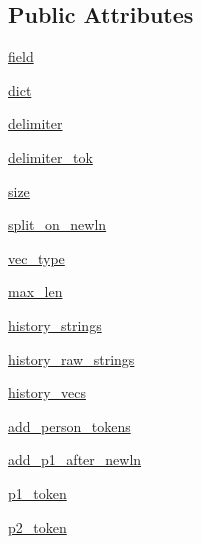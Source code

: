 \subsection*{Public Attributes}
\begin{DoxyCompactItemize}
\item 
\hyperlink{classparlai_1_1core_1_1torch__agent_1_1History_a3481b17d1cd076c5e3ee82178ea7411a}{field}
\item 
\hyperlink{classparlai_1_1core_1_1torch__agent_1_1History_af2dcae73b57a3718cdcb558377a3526b}{dict}
\item 
\hyperlink{classparlai_1_1core_1_1torch__agent_1_1History_ae9e14eb1f34edb914930178e0ecfdb01}{delimiter}
\item 
\hyperlink{classparlai_1_1core_1_1torch__agent_1_1History_a3120b2e6c188316aeffdf1bafbd5baa6}{delimiter\+\_\+tok}
\item 
\hyperlink{classparlai_1_1core_1_1torch__agent_1_1History_a18b6c863146d30b93d15de840566044b}{size}
\item 
\hyperlink{classparlai_1_1core_1_1torch__agent_1_1History_a26d15b60abb195247309c4680657a196}{split\+\_\+on\+\_\+newln}
\item 
\hyperlink{classparlai_1_1core_1_1torch__agent_1_1History_a7e5b6e0372fa48e0e1ba747b5628bfc7}{vec\+\_\+type}
\item 
\hyperlink{classparlai_1_1core_1_1torch__agent_1_1History_acded8e2717f7b9d527076c89a7fbd3f9}{max\+\_\+len}
\item 
\hyperlink{classparlai_1_1core_1_1torch__agent_1_1History_ac2aea76f6a052461e74aa050bb69408a}{history\+\_\+strings}
\item 
\hyperlink{classparlai_1_1core_1_1torch__agent_1_1History_a93643f51a5a2ab0478dff99d571c5f41}{history\+\_\+raw\+\_\+strings}
\item 
\hyperlink{classparlai_1_1core_1_1torch__agent_1_1History_a7d5060a88829f087033ea7ba928ceb1d}{history\+\_\+vecs}
\item 
\hyperlink{classparlai_1_1core_1_1torch__agent_1_1History_a1ceeb7bf9ff2209a9aafff142e667006}{add\+\_\+person\+\_\+tokens}
\item 
\hyperlink{classparlai_1_1core_1_1torch__agent_1_1History_aa0ab2c82ef1ba339dd04eafd57c082e5}{add\+\_\+p1\+\_\+after\+\_\+newln}
\item 
\hyperlink{classparlai_1_1core_1_1torch__agent_1_1History_a7eff0681e0eee4051abb530797f15884}{p1\+\_\+token}
\item 
\hyperlink{classparlai_1_1core_1_1torch__agent_1_1History_ab9f9f10b0dd73d90d3798fb3e1787ee6}{p2\+\_\+token}
\end{DoxyCompactItemize}


